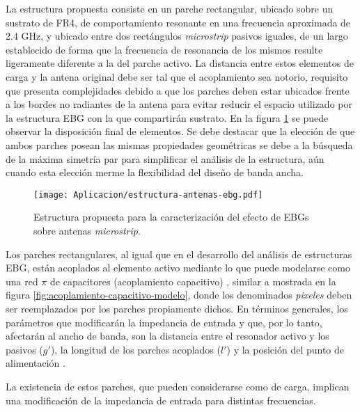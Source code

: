 La estructura propuesta consiste en un parche rectangular, ubicado sobre un sustrato de FR4, de comportamiento resonante en una frecuencia aproximada de 2.4 GHz, y ubicado entre dos rectángulos \textit{microstrip} pasivos iguales, de un largo establecido de forma que la frecuencia de resonancia de los mismos resulte ligeramente diferente a la del parche activo. La distancia entre estos elementos de carga y la antena original debe ser tal que el acoplamiento sea notorio, requisito que presenta complejidades \cite{Kumar:radiating} debido a que los parches deben estar ubicados frente a los bordes no radiantes de la antena para evitar reducir el espacio utilizado por la estructura EBG con la que compartirán sustrato. En la figura \ref{fig:antena-propuesta-con-ebg} se puede observar la disposición final de elementos. Se debe destacar que la elección de que ambos parches posean las mismas propiedades geométricas se debe a la búsqueda de la máxima simetría par para simplificar el análisis de la estructura, aún cuando esta elección merme la flexibilidad del diseño de banda ancha.

\begin{figure}[h]
	\centering
	\texttt{[image: Aplicacion/estructura-antenas-ebg.pdf]}
	\caption{Estructura propuesta para la caracterización del efecto de EBGs sobre antenas \textit{microstrip}.}
	\label{fig:antena-propuesta-con-ebg}
\end{figure}


Los parches rectangulares, al igual que en el desarrollo del análisis de estructuras EBG, están acoplados al elemento activo mediante lo que puede modelarse como una red $\pi$ de capacitores (acoplamiento capacitivo) \cite{Kumar:Non-radiating}, similar a mostrada en la figura \ref{fig:acoplamiento-capacitivo-modelo}, donde los denominados \textit{pixeles} deben ser reemplazados por los parches propiamente dichos. En términos generales, los parámetros que modificarán la impedancia de entrada y que, por lo tanto, afectarán al ancho de banda, son la distancia entre el resonador activo y los pasivos ($g'$), la longitud de los parches acoplados ($l'$) y la posición del punto de alimentación \cite{Kumar:Non-radiating}.

La existencia de estos parches, que pueden considerarse como de carga, implican una modificación de la impedancia de entrada para distintas frecuencias.

